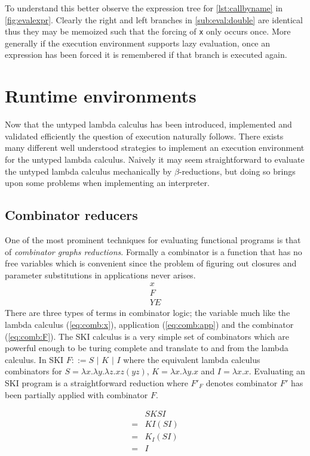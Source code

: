 \documentclass[11pt,oneside,a4paper]{report}
\begin{document}
To understand this better observe the expression tree for \autoref{lst:callbyname} in \autoref{fig:evalexpr}.
Clearly the right and left branches in \autoref{sub:eval:double} are identical thus they may be memoized such that the forcing of \texttt{x} only occurs once.
More generally if the execution environment supports lazy evaluation, once an expression has been forced it is remembered if that branch is executed again.

\section{Runtime environments}
Now that the untyped lambda calculus has been introduced, implemented and validated efficiently the question of execution naturally follows.
There exists many different well understood strategies to implement an execution environment for the untyped lambda calculus.
Naively it may seem straightforward to evaluate the untyped lambda calculus mechanically by $\beta$-reductions, but doing so brings upon some problems when implementing an interpreter.

\subsection{Combinator reducers}
One of the most prominent techniques for evaluating functional programs is that of \textit{combinator graphs reductions}.
Formally a combinator is a function that has no free variables which is convenient since the problem of figuring out closures and parameter substitutions in applications never arises.
\begin{align}
    x \label{eq:comb:x}\\
    F \label{eq:comb:F}\\
    Y E \label{eq:comb:app}
\end{align}
There are three types of terms in combinator logic; the variable much like the lambda calculus (\autoref{eq:comb:x}), application (\autoref{eq:comb:app}) and the combinator (\autoref{eq:comb:F}).
The SKI calculus is a very simple set of combinators which are powerful enough to be turing complete and translate to and from the lambda calculus.
In SKI $F ::= S \,\,|\,\, K \,\,|\,\, I$ where the equivalent lambda calculus combinators for $S = \lambda x . \lambda y . \lambda z . x z (y z)$, $K = \lambda x . \lambda y . x$ and $I = \lambda x . x$.
Evaluating an SKI program is a straightforward reduction where $F'_F$ denotes combinator $F'$ has been partially applied with combinator $F$.
\begin{exmp}
    \begin{align}
        &SKSI\\
        = &KI(SI)\tag*{}\\
        = &K_I(SI)\tag*{}\\
        = &I\tag*{}
    \end{align}
\end{exmp}
\end{document}

